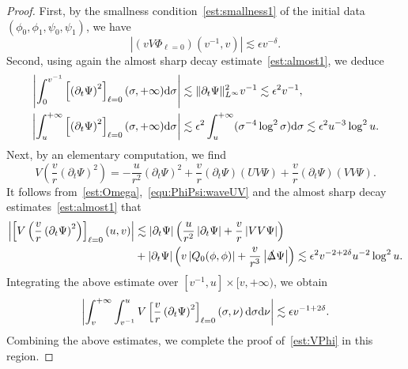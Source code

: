 \documentclass[a4paper,reqno]{amsart}
\theoremstyle{definition}
\numberwithin{equation}{section}
\def \d {{\rm{d}}}
\def \pt{\partial_{t}}
\def\Deltas{\slashed{\Delta}}
\def\ep{\epsilon}
\begin{document}
\begin{proof}
\smallskip
First, by the smallness condition~\eqref{est:smallness1} of the initial data $(\phi_{0}, \phi_1, \psi_{0}, \psi_1)$, we have
\begin{equation*}
  \left|  \left(vV\Phi_{\ell=0}\right)(v^{-1},v)\right|\lesssim
  \ep v^{-\delta}.
\end{equation*}
Second, using again the almost sharp decay estimate~\eqref{est:almost1}, we deduce
\begin{align*}
\left|\int_{0}^{v^{-1}}\left[\left(\pt \Psi\right)^{2}\right]_{\ell=0}(\sigma,+\infty)\d \sigma   \right|&\lesssim \|\pt \Psi\|_{L^{\infty}}^{2}v^{-1}
\lesssim \ep^2 v^{-1},\\
\left|\int_{u}^{+\infty}\left[\left(\pt \Psi\right)^{2}\right]_{\ell=0}(\sigma,+\infty)\d \sigma\right|
&\lesssim \ep^{2}\int_{u}^{+\infty}(\sigma^{-4}\log^{2}\sigma)\d \sigma\lesssim \ep^2 u^{-3}\log^{2}u.
\end{align*}
Next, by an elementary computation, we find
\begin{equation*}
V\left(\frac{v}{r}\left(\pt \Psi\right)^{2}\right)
=-\frac{u}{r^{2}}\left(\pt \Psi\right)^{2}
+\frac{v}{r}\left(\pt \Psi\right)\left(UV\Psi\right)
+\frac{v}{r}\left(\pt \Psi\right)\left(VV\Psi\right).
\end{equation*}
It follows from~\eqref{est:Omega},~\eqref{equ:PhiPsi:waveUV} and the almost sharp decay estimates~\eqref{est:almost1} that
\begin{equation*}
\begin{aligned}
\left|\left[V\left(\frac{v}{r}\left(\pt \Psi\right)^{2}\right)\right]_{\ell=0}(u,v)\right|
&\lesssim \left|\pt \Psi\right|\left(\frac{u}{r^{2}}\left|\pt \Psi\right|+\frac{v}{r}\left|VV\Psi\right|\right)\\
&+\left|\pt \Psi\right|\left(v\left|Q_{0}(\phi,\phi)\right|+\frac{v}{r^{3}}\left|\Deltas \Psi\right|\right)\lesssim \ep^2 v^{-2+2\delta}u^{-2}\log^{2}u.
\end{aligned}
\end{equation*}
Integrating the above estimate over $ [v^{-1},u]\times
[v,+\infty)$, we obtain
\begin{equation*}
\left|\int_{v}^{+\infty}\int_{v^{-1}}^{u}V\left[\frac{v}{r}\left(\pt \Psi\right)^{2}\right]_{\ell=0}\left(\sigma,\nu\right)\d \sigma \d \nu\right|\lesssim \ep v^{-1+2\delta}.
\end{equation*}
Combining the above estimates, we complete the proof of~\eqref{est:VPhi} in this region.
\end{proof}
\end{document}
